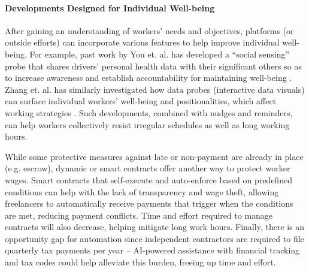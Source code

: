 \paragraph{Developments Designed for Individual Well-being}
After gaining an understanding of workers' needs and objectives, platforms (or outside efforts) can incorporate various features to help improve individual well-being. For example, past work by You et. al. has developed a ``social sensing'' probe that shares drivers' personal health data with their significant others so as to increase awareness and establish accountability for maintaining well-being \cite{you2021go}. Zhang et. al. has similarly investigated how data probes (interactive data visuals) can surface individual workers' well-being and positionalities, which affect working strategies \cite{zhang2023stakeholder}.
Such developments, combined with nudges and reminders, can help workers collectively resist irregular schedules as well as long working hours. 

While some protective measures against late or non-payment are already in place (e.g. escrow), dynamic or smart contracts offer another way to protect worker wages. Smart contracts that self-execute and auto-enforce based on predefined conditions can help with the lack of transparency and wage theft, allowing freelancers to automatically receive payments that trigger when the conditions are met, reducing payment conflicts. Time and effort required to manage contracts will also decrease, helping mitigate long work hours. Finally, there is an opportunity gap for automation since independent contractors are required to file quarterly tax payments per year -- AI-powered assistance with financial tracking and tax codes could help alleviate this burden, freeing up time and effort.
